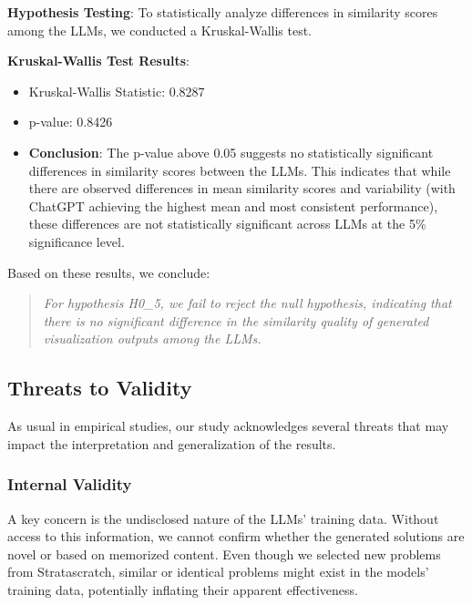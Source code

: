 \documentclass[conference]{IEEEtran}
\begin{document}

\textbf{Hypothesis Testing}: To statistically analyze differences in similarity scores among the LLMs, we conducted a Kruskal-Wallis test. 

\textbf{Kruskal-Wallis Test Results}:  
\begin{itemize}
    \item Kruskal-Wallis Statistic: 0.8287  
    \item p-value: 0.8426  
    \item \textbf{Conclusion}: The p-value above 0.05 suggests no statistically significant differences in similarity scores between the LLMs. This indicates that while there are observed differences in mean similarity scores and variability (with ChatGPT achieving the highest mean and most consistent performance), these differences are not statistically significant across LLMs at the 5\% significance level.
\end{itemize}

Based on these results, we conclude:
\begin{quote}
\textit{For hypothesis H0\_5, we fail to reject the null hypothesis, indicating that there is no significant difference in the similarity quality of generated visualization outputs among the LLMs.}
\end{quote}


\subsection{Threats to Validity}

As usual in empirical studies, our study acknowledges several threats that may impact the interpretation and generalization of the results. 

\subsubsection{Internal Validity}

A key concern is the undisclosed nature of the LLMs' training data. Without access to this information, we cannot confirm whether the generated solutions are novel or based on memorized content. Even though we selected new problems from Stratascratch, similar or identical problems might exist in the models' training data, potentially inflating their apparent effectiveness.
\end{document}
